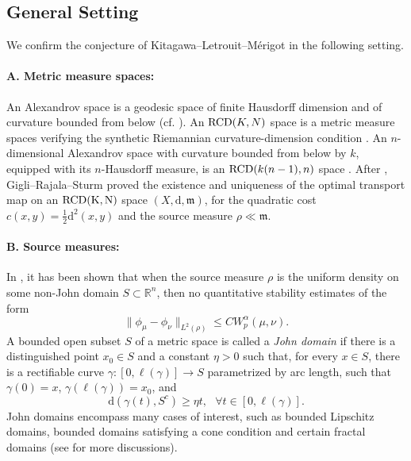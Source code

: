 \documentclass[a4paper,11pt]{article}
\numberwithin{equation}{section}
\theoremstyle{plain}
\theoremstyle{definition}
\theoremstyle{remark}
\newcommand{\mm}{\mathfrak m}
\newcommand{\R}{\mathbb{R}}
\renewcommand{\d}{{\mathrm d}}
\begin{document}
	
	
	\subsection{General Setting}
	We confirm the conjecture of Kitagawa--Letrouit--M\'erigot  in the  following setting.
	
\paragraph{A.  Metric measure spaces:}	An Alexandrov space is a  geodesic  space of finite Hausdorff dimension and of curvature bounded from below (cf.  \cite{zbMATH01626771}).   An ${\rm RCD}(K,N)$ space  is  a metric measure spaces verifying the synthetic Riemannian curvature-dimension condition  \cite{zbMATH05049052,zbMATH05578758, zbMATH06303881, G-O}.   An $n$-dimensional Alexandrov space with curvature bounded from below by $k$,  equipped with its $n$-Hausdorff measure,   is an ${\rm RCD}(k(n-1), n)$ space  \cite{zbMATH06032507,zbMATH05962558}.
		 After \cite{brenier1991polar, mccann2001polar},   Gigli--Rajala--Sturm \cite[Theorem 1.1]{ gigli2016optimal}  proved the existence and uniqueness of the optimal transport map on an $\rm{RCD}(K,N)$ space $(X,\d,\mm)$,  for the quadratic cost $c(x,y)=\frac{1}{2}\d^2(x,y)$ and the source measure $\rho\ll \mm$. 
	
	
	
\paragraph{B.  Source measures:}	In  \cite[Theorem 1.9]{arXiv:2411.04908}, it has been shown that when the source measure $\rho$ is the uniform density on some non-John domain  $S\subset \R^n$, then no quantitative stability estimates of the form $$\|\phi_\mu-\phi_\nu\|_{L^2(\rho)}\leq C W_p^\alpha(\mu,\nu).$$    A bounded open subset $S$ of a metric space is called a \emph{John domain} if there is a distinguished point $x_0 \in S$ and a constant $\eta > 0$ such that, for every $x \in S$, there is a rectifiable curve $\gamma \colon [0, \ell(\gamma)] \to S$ parametrized by arc length, such that $\gamma(0) = x$, $\gamma(\ell(\gamma)) = x_0$, and
		\begin{equation*}
			\d(\gamma(t), S^c) \geq \eta t,~~~\forall t \in [0, \ell(\gamma)].
		\end{equation*}
	John domains  encompass many cases of interest, such as  bounded Lipschitz domains, bounded domains satisfying a cone condition and certain fractal domains (see \cite{zbMATH00858510} for more discussions). 
\end{document}
